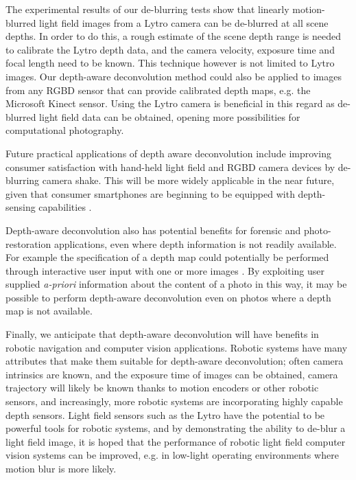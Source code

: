 The experimental results of our de-blurring tests show that linearly motion-blurred light field images from a Lytro camera can be de-blurred at all scene depths.
In order to do this, a rough estimate of the scene depth range is needed to calibrate the Lytro depth data, and the camera velocity, exposure time and focal length need to be known.
This technique however is not limited to Lytro images.
Our depth-aware deconvolution method could also be applied to images from any RGBD sensor that can provide calibrated depth maps, e.g. the Microsoft Kinect sensor. 
Using the Lytro camera is beneficial in this regard as de-blurred light field data can be obtained, opening more possibilities for computational photography.

Future practical applications of depth aware deconvolution include improving consumer satisfaction with hand-held light field and RGBD camera devices by de-blurring camera shake.
This will be more widely applicable in the near future, given that consumer smartphones are beginning to be equipped with depth-sensing capabilities \cite{google2014lensblur, google2014tango}.

Depth-aware deconvolution also has potential benefits for forensic and photo-restoration applications, even where depth information is not readily available.
For example the specification of a depth map could potentially be performed through interactive user input with one or more images \cite{sinha2008interactive}.
By exploiting user supplied \emph{a-priori} information about the content of a photo in this way, it may be possible to perform depth-aware deconvolution even on photos where a depth map is not available. 

Finally, we anticipate that depth-aware deconvolution will have benefits in robotic navigation and computer vision applications.
Robotic systems have many attributes that make them suitable for depth-aware deconvolution; often camera intrinsics are known, and the exposure time of images can be obtained, camera trajectory will likely be known thanks to motion encoders or other robotic sensors, and increasingly, more robotic systems are incorporating highly capable depth sensors.
Light field sensors such as the Lytro have the potential to be powerful tools for robotic systems, and by demonstrating the ability to de-blur a light field image, it is hoped that the performance of robotic light field computer vision systems can be improved, e.g. in low-light operating environments where motion blur is more likely.


